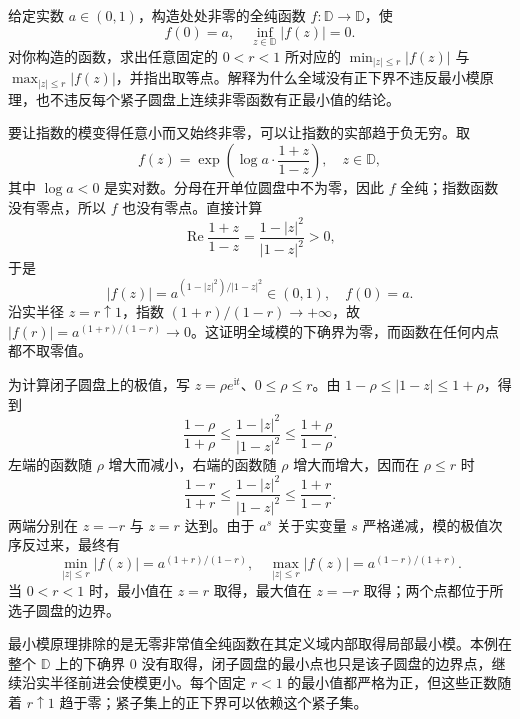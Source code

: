 \begin{exercise}\label{b3:ex:02-8}
给定实数 \(a\in(0,1)\)，构造处处非零的全纯函数 \(f:\mathbb D\rightarrow\mathbb D\)，使
\[
  f(0)=a,\quad\inf_{z\in\mathbb D}|f(z)|=0.
\]
对你构造的函数，求出任意固定的 \(0<r<1\) 所对应的
\(\min_{|z|\le r}|f(z)|\) 与 \(\max_{|z|\le r}|f(z)|\)，并指出取等点。解释为什么全域没有正下界不违反最小模原理，也不违反每个紧子圆盘上连续非零函数有正最小值的结论。
\end{exercise}
\begin{solution}
要让指数的模变得任意小而又始终非零，可以让指数的实部趋于负无穷。取
\[
  f(z)=\exp\left(\log a\cdot\frac{1+z}{1-z}\right),
  \quad z\in\mathbb D,
\]
其中 \(\log a<0\) 是实对数。分母在开单位圆盘中不为零，因此 \(f\) 全纯；指数函数没有零点，所以 \(f\) 也没有零点。直接计算
\[
  \operatorname{Re}\frac{1+z}{1-z}
  =\frac{1-|z|^2}{|1-z|^2}>0,
\]
于是
\[
  |f(z)|=a^{(1-|z|^2)/|1-z|^2}\in(0,1),
  \quad f(0)=a.
\]
沿实半径 \(z=r\uparrow1\)，指数 \((1+r)/(1-r)\to+\infty\)，故
\(|f(r)|=a^{(1+r)/(1-r)}\to0\)。这证明全域模的下确界为零，而函数在任何内点都不取零值。

为计算闭子圆盘上的极值，写 \(z=\rho e^{\mathrm{i}t}\)、\(0\le\rho\le r\)。由
\(1-\rho\le|1-z|\le1+\rho\)，得到
\[
  \frac{1-\rho}{1+\rho}
  \le\frac{1-|z|^2}{|1-z|^2}
  \le\frac{1+\rho}{1-\rho}.
\]
左端的函数随 \(\rho\) 增大而减小，右端的函数随 \(\rho\) 增大而增大，因而在 \(\rho\le r\) 时
\[
  \frac{1-r}{1+r}
  \le\frac{1-|z|^2}{|1-z|^2}
  \le\frac{1+r}{1-r}.
\]
两端分别在 \(z=-r\) 与 \(z=r\) 达到。由于 \(a^s\) 关于实变量 \(s\) 严格递减，模的极值次序反过来，最终有
\[
  \min_{|z|\le r}|f(z)|=a^{(1+r)/(1-r)},
  \quad\max_{|z|\le r}|f(z)|=a^{(1-r)/(1+r)}.
\]
当 \(0<r<1\) 时，最小值在 \(z=r\) 取得，最大值在 \(z=-r\) 取得；两个点都位于所选子圆盘的边界。

最小模原理排除的是无零非常值全纯函数在其定义域内部取得局部最小模。本例在整个 \(\mathbb D\) 上的下确界 \(0\) 没有取得，闭子圆盘的最小点也只是该子圆盘的边界点，继续沿实半径前进会使模更小。每个固定 \(r<1\) 的最小值都严格为正，但这些正数随着 \(r\uparrow1\) 趋于零；紧子集上的正下界可以依赖这个紧子集。
\end{solution}

